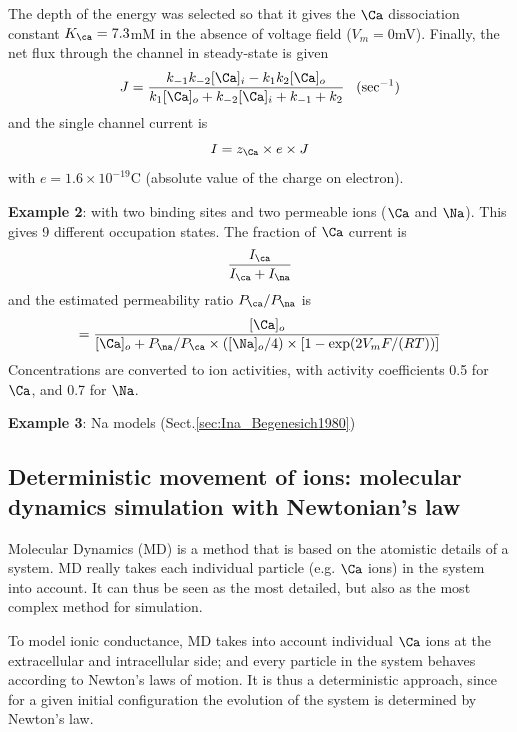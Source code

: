The depth of the energy was selected so that it gives the $\Ca$
dissociation constant $K_\ca=7.3$mM in the absence of voltage field
($V_m=0$mV). Finally, the net flux through the channel in steady-state is given
\begin{equation}
  \label{eq:1042}
  J=\frac{k_{-1}k_{-2}[\Ca]_i-k_1k_2[\Ca]_o}{k_1[\Ca]_o+k_{-2}[\Ca]_i+k_{-1}+k_2}
  \;\;\; (\text{sec}^{-1})
\end{equation}
and the single channel current is
\begin{equation}
  \label{eq:1043}
  I = z_\Ca \times e \times J
\end{equation}
with $e = 1.6\times 10^{-19}$C (absolute value of the charge on electron).


{\bf Example 2}: \citep{vanHooft2003} with two binding sites and two permeable
ions ($\Ca$ and $\Na$). This gives 9 different occupation states. The fraction
of $\Ca$ current is
\begin{equation}
\frac{I_\ca}{I_\ca + I_\na}
\end{equation}
and the estimated permeability ratio $P_\ca/P_\na$ is
\begin{equation}
= \frac{[\Ca]_o}{[\Ca]_o + P_\na/P_\ca \times ([\Na]_o/4)\times \left[ 1 -
\exp(2V_mF/(RT)) \right]}
\end{equation}
Concentrations are converted to ion activities, with activity coefficients 0.5
for $\Ca$, and 0.7 for $\Na$.

{\bf Example 3}: Na models  (Sect.\ref{sec:Ina_Begenesich1980})




\subsection{Deterministic movement of ions: molecular dynamics simulation with
Newtonian's law}

Molecular Dynamics (MD) is a method that is based on the atomistic details of a
system. MD really takes each individual particle (e.g. $\Ca$ ions) in the system
into account. It can thus be seen as the most detailed, but also as the
most complex method for simulation.

To model ionic conductance, MD takes into account individual $\Ca$ ions at the
extracellular and intracellular side; and every particle in the system behaves
according to Newton's laws of motion. It is thus a deterministic approach, since
for a given initial configuration the evolution of the system is determined by
Newton's law.

